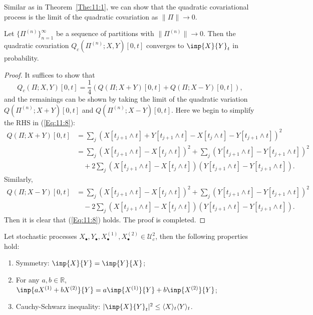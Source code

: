 Similar as in Theorem~\ref{The:11:1}, we can show that the quadratic covariational process is the limit of the quadratic covariation as $\|\Pi\|\to0$.

\begin{theorem}
Let $\{\Pi^{(n)}\}_{n=1}^\infty$ be a sequence of partitions with $\|\Pi^{(n)}\|\to0$.
Then the quadratic covariation $Q_c(\Pi^{(n)};X,Y)[0,t]$ converges to $\inp{X}{Y}_t$ in probability.
\end{theorem}

\begin{proof}
It suffices to show that 
\begin{equation}\label{Eq:11:8}
Q_c(\Pi;X,Y)[0,t]=\frac{1}{4}\left(
Q(\Pi;X+Y)[0,t] + Q(\Pi;X-Y)[0,t]
\right),
\end{equation}
and the remainings can be shown by taking the limit of the quadratic variation $Q(\Pi^{(n)};X+Y)[0,t]$ and $Q(\Pi^{(n)};X-Y)[0,t]$.
Here we begin to simplify the RHS in (\eqref{Eq:11:8}):
\begin{align*}
Q(\Pi;X+Y)[0,t]&=\sum_j\left(
X[t_{j+1}\land t] + Y[t_{j+1}\land t] - X[t_{j}\land t] - Y[t_{j+1}\land t]
\right)^2\\
&=\sum_j\left(
X[t_{j+1}\land t] - X[t_{j}\land t] 
\right)^2+\sum_j\left(
Y[t_{j+1}\land t] - Y[t_{j+1}\land t]
\right)^2\\
&\quad + 2\sum_j\left(
X[t_{j+1}\land t] - X[t_{j}\land t] 
\right)\left(
Y[t_{j+1}\land t] - Y[t_{j+1}\land t]
\right).
\end{align*}
Similarly,
\begin{align*}
Q(\Pi;X-Y)[0,t]&=\sum_j\left(
X[t_{j+1}\land t] - X[t_{j}\land t] 
\right)^2+\sum_j\left(
Y[t_{j+1}\land t] - Y[t_{j+1}\land t]
\right)^2\\
&\quad -2\sum_j\left(
X[t_{j+1}\land t] - X[t_{j}\land t] 
\right)\left(
Y[t_{j+1}\land t] - Y[t_{j+1}\land t]
\right).
\end{align*}
Then it is clear that (\eqref{Eq:11:8}) holds.
The proof is completed.
\end{proof}


\begin{proposition}
Let stochastic processes $X_{\bullet},Y_{\bullet}, X_{\bullet}^{(1)},X_{\bullet}^{(2)}\in\mathcal{U}_c^2$, then the following properties hold:
\begin{enumerate}
\item
Symmetry: $\inp{X}{Y}=\inp{Y}{X}$;
\item
For any $a,b\in\mathbb{R}$, $\inp{aX^{(1)} + bX^{(2)}}{Y} = a\inp{X^{(1)}}{Y} + b\inp{X^{(2)}}{Y}$;
\item
Cauchy-Schwarz inequality: $|\inp{X}{Y}_t|^2 \le \langle X\rangle_t\langle Y\rangle_t$.
\end{enumerate}
\end{proposition}

